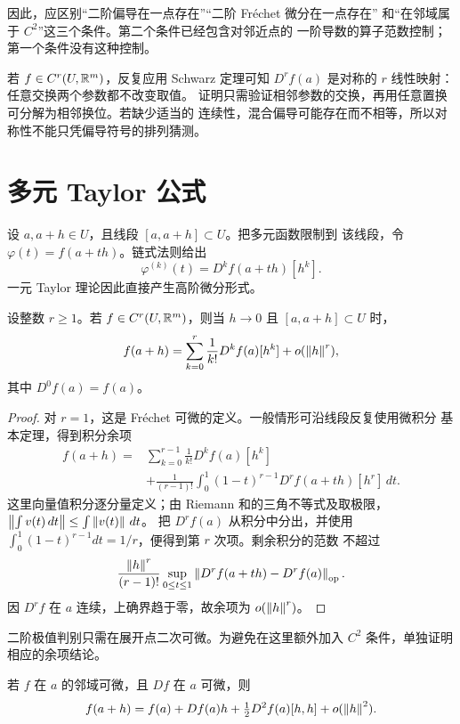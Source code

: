 因此，应区别“二阶偏导在一点存在”“二阶 Fréchet 微分在一点存在”
和“在邻域属于 \(C^2\)”这三个条件。第二个条件已经包含对邻近点的
一阶导数的算子范数控制；第一个条件没有这种控制。

若 \(f\in C^r(U,\mathbb{R}^m)\)，反复应用 Schwarz 定理可知
\(D^rf(a)\) 是对称的 \(r\) 线性映射：任意交换两个参数都不改变取值。
证明只需验证相邻参数的交换，再用任意置换可分解为相邻换位。若缺少适当的
连续性，混合偏导可能存在而不相等，所以对称性不能只凭偏导符号的排列猜测。

\section{多元 Taylor 公式}

设 \(a,a+h\in U\)，且线段 \([a,a+h]\subset U\)。把多元函数限制到
该线段，令 \(\varphi(t)=f(a+th)\)。链式法则给出
\[
 \varphi^{(k)}(t)=D^kf(a+th)[h^k].
\]
一元 Taylor 理论因此直接产生高阶微分形式。

\begin{theorem}
\label{thm:multivariable-taylor-peano}
设整数 \(r\ge1\)。若 \(f\in C^r(U,\mathbb{R}^m)\)，则当 \(h\to0\) 且 \([a,a+h]\subset U\) 时，
\[
 f(a+h)=\sum_{k=0}^r\frac1{k!}D^kf(a)[h^k]+o(\left\lVert h\right\rVert^r),
\]
其中 \(D^0f(a)=f(a)\)。
\end{theorem}

\begin{proof}
对 \(r=1\)，这是 Fréchet 可微的定义。一般情形可沿线段反复使用微积分
基本定理，得到积分余项
\[
 \begin{split}
 f(a+h)={}&\sum_{k=0}^{r-1}\frac1{k!}D^kf(a)[h^k]\\
 &+\frac1{(r-1)!}\int_0^1(1-t)^{r-1}
 D^rf(a+th)[h^r]\,dt.
 \end{split}
\]
这里向量值积分逐分量定义；由 Riemann 和的三角不等式及取极限，
\(\left\lVert\int v(t)\,dt\right\rVert\le\int\left\lVert v(t)\right\rVert\,dt\)。
把 \(D^rf(a)\) 从积分中分出，并使用
\(\int_0^1(1-t)^{r-1}dt=1/r\)，便得到第 \(r\) 次项。剩余积分的范数
不超过
\[
 \frac{\left\lVert h\right\rVert^r}{(r-1)!}
 \sup_{0\le t\le1}
 \left\lVert D^rf(a+th)-D^rf(a)\right\rVert_{\mathrm{op}}.
\]
因 \(D^rf\) 在 \(a\) 连续，上确界趋于零，故余项为
\(o(\left\lVert h\right\rVert^r)\)。
\end{proof}

二阶极值判别只需在展开点二次可微。为避免在这里额外加入 \(C^2\)
条件，单独证明相应的余项结论。

\begin{proposition}
\label{prop:second-peano-pointwise}
若 \(f\) 在 \(a\) 的邻域可微，且 \(Df\) 在 \(a\) 可微，则
\[
 f(a+h)=f(a)+Df(a)h+\tfrac12D^2f(a)[h,h]+o(\left\lVert h\right\rVert^2).
\]
\end{proposition}

